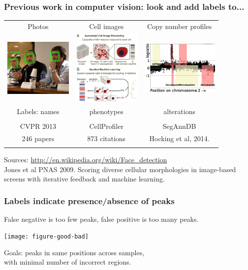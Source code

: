 \documentclass{beamer}
\begin{document}
\begin{frame}
  \frametitle{Previous work in computer vision: look and add labels
    to...}
  \begin{tabular}{ccc}
    Photos & Cell images & Copy number profiles \\
    \includegraphics[width=1.3in]{faces} &
    \includegraphics[width=1.3in]{cellprofiler} &
    \includegraphics[width=1.5in]{regions-axes}\\
    Labels: names & phenotypes & alterations \\ \\
    CVPR 2013 & CellProfiler & SegAnnDB \\
    246 papers & 873 citations & Hocking et al, 2014. \\
     &
  \end{tabular}
  Sources: \url{http://en.wikipedia.org/wiki/Face_detection}\\
  Jones et al PNAS 2009. Scoring diverse cellular morphologies in
  image-based screens with iterative feedback and machine learning.
\end{frame}

\begin{frame}
  \frametitle{Labels indicate presence/absence of peaks}

  False negative is too few peaks, false positive is too many peaks.

  \texttt{[image: figure-good-bad]}

  Goals: peaks in same positions across samples,\\
  with minimal number of incorrect regions.

\end{frame}
\end{document}
